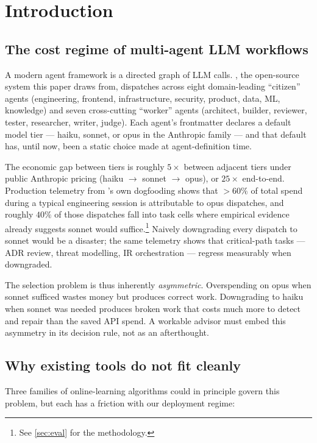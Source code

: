 \section{Introduction}
\label{sec:intro}

\subsection{The cost regime of multi-agent LLM workflows}

A modern agent framework is a directed graph of LLM calls. \blackrim, the
open-source system this paper draws from, dispatches across eight
domain-leading ``citizen'' agents (engineering, frontend, infrastructure,
security, product, data, ML, knowledge) and seven cross-cutting ``worker''
agents (architect, builder, reviewer, tester, researcher, writer, judge). Each
agent's frontmatter declares a default model tier --- haiku, sonnet, or opus
in the Anthropic family --- and that default has, until now, been a static
choice made at agent-definition time.

The economic gap between tiers is roughly $5\times$ between adjacent tiers
under public Anthropic pricing (haiku $\to$ sonnet $\to$ opus), or
$25\times$ end-to-end. Production telemetry from \blackrim's own dogfooding
shows that $> 60\%$ of total spend during a typical engineering session is
attributable to opus dispatches, and roughly $40\%$ of those dispatches
fall into task cells where empirical evidence already suggests sonnet would
suffice.\footnote{See \cref{sec:eval} for the methodology.} Naively
downgrading every dispatch to sonnet would be a disaster; the same telemetry
shows that critical-path tasks --- ADR review, threat modelling, IR
orchestration --- regress measurably when downgraded.

The selection problem is thus inherently \emph{asymmetric}. Overspending on
opus when sonnet sufficed wastes money but produces correct work. Downgrading
to haiku when sonnet was needed produces broken work that costs much more to
detect and repair than the saved API spend. A workable advisor must
embed this asymmetry in its decision rule, not as an afterthought.

\subsection{Why existing tools do not fit cleanly}

Three families of online-learning algorithms could in principle govern this
problem, but each has a friction with our deployment regime:

